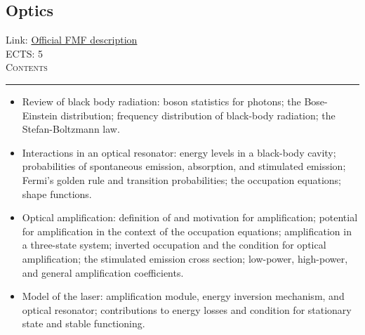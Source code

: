\documentclass[11pt, a4paper]{article}
\newenvironment{course}[3]{
\subsection{#1}%
Link: \href{#2}{Official FMF description}\\%
ECTS: #3%
\vspace{1ex}
\\
{\large \textsc{Contents}}\\[-0.9ex]%
\rule{\textwidth}{0.5pt}
\vspace{-3ex}
}
{}
\newenvironment{chapter}[1]{
\begin{tcolorbox}[title=#1, breakable]
}
{\end{tcolorbox}}
\begin{document}
\begin{course}{Optics}{https://www.fmf.uni-lj.si/en/study-physics/programmes/1fiz/2020/7000777/courses/1165/}{5}
\begin{chapter}{Introduction to lasers}
\begin{itemize}
            \item Review of black body radiation: boson statistics for photons; the Bose-Einstein distribution; frequency distribution of black-body radiation; the Stefan-Boltzmann law.

            \item Interactions in an optical resonator: energy levels in a black-body cavity; probabilities of spontaneous emission, absorption, and stimulated emission; Fermi's golden rule and transition probabilities; the occupation equations; shape functions.

            \item Optical amplification: definition of and motivation for amplification; potential for amplification in the context of the occupation equations; amplification in a three-state system; inverted occupation and the condition for optical amplification; the stimulated emission cross section; low-power, high-power, and general amplification coefficients.

            \item Model of the laser: amplification module, energy inversion mechanism, and optical resonator; contributions to energy losses and condition for stationary state and stable functioning.
        
        \end{itemize}
    \end{chapter}
\end{course}
\end{document}
